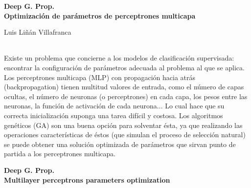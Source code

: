 \thispagestyle{empty}

\begin{center}

    {\large\bfseries Deep G. Prop. \\ Optimización de parámetros de perceptrones
multicapa}\\

\end{center}

\begin{center}

    Luis Liñán Villafranca \\

\end{center}

\vspace{0.7cm}

\vspace{0.5cm}
\vspace{0.7cm}

\\

Existe un problema que concierne a los modelos de clasificación supervisada:
encontrar la configuración de parámetros adecuada al problema al que se aplica.
Los perceptrones multicapa (MLP) con propagación hacia atrás (backpropagation)
tienen multitud valores de entrada, como el número de capas ocultas, el número
de neuronas (o perceptrones) en cada capa, los pesos entre las neuronas, la
función de activación de cada neurona... Lo cual hace que su correcta
inicialización suponga una tarea difícil y costosa. Los algoritmos genéticos
(GA) son una buena opción para solventar ésta, ya que realizando las
operaciones características de éstos (que simulan el proceso de selección
natural) se puede obtener una solución optimizada de parámetros que sirvan
punto de partida a los perceptrones multicapa.

\cleardoublepage

\begin{center}

    {\large\bfseries Deep G. Prop. \\ Multilayer perceptrons parameters
    optimization}\\

\end{center}


